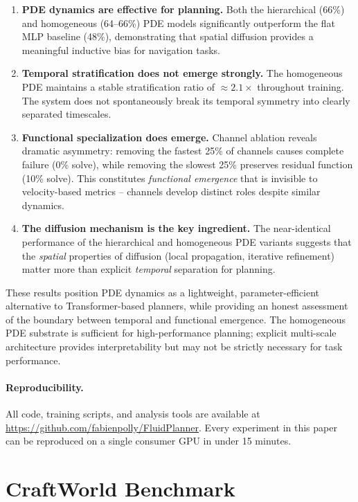 \documentclass{article}
\begin{document}
\begin{itemize}
\begin{enumerate}
    \item \textbf{PDE dynamics are effective for planning.} Both the hierarchical (66\%) and homogeneous (64--66\%) PDE models significantly outperform the flat MLP baseline (48\%), demonstrating that spatial diffusion provides a meaningful inductive bias for navigation tasks.
    \item \textbf{Temporal stratification does not emerge strongly.} The homogeneous PDE maintains a stable stratification ratio of $\approx 2.1\times$ throughout training. The system does not spontaneously break its temporal symmetry into clearly separated timescales.
    \item \textbf{Functional specialization does emerge.} Channel ablation reveals dramatic asymmetry: removing the fastest 25\% of channels causes complete failure (0\% solve), while removing the slowest 25\% preserves residual function (10\% solve). This constitutes \emph{functional emergence} that is invisible to velocity-based metrics -- channels develop distinct roles despite similar dynamics.
    \item \textbf{The diffusion mechanism is the key ingredient.} The near-identical performance of the hierarchical and homogeneous PDE variants suggests that the \emph{spatial} properties of diffusion (local propagation, iterative refinement) matter more than explicit \emph{temporal} separation for planning.
\end{enumerate}

These results position PDE dynamics as a lightweight, parameter-efficient alternative to Transformer-based planners, while providing an honest assessment of the boundary between temporal and functional emergence. The homogeneous PDE substrate is sufficient for high-performance planning; explicit multi-scale architecture provides interpretability but may not be strictly necessary for task performance.

\paragraph{Reproducibility.} All code, training scripts, and analysis tools are available at \url{https://github.com/fabienpolly/FluidPlanner}. Every experiment in this paper can be reproduced on a single consumer GPU in under 15 minutes.

\appendix
\section{CraftWorld Benchmark}
\label{app:craftworld}


\end{itemize}
\end{document}
